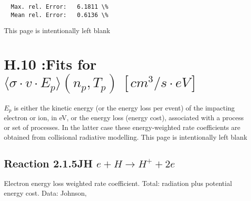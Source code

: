 \documentclass[12pt,dvipdfmx]{article}
\begin{document}
\begin{small}
\begin{verbatim}
  Max. rel. Error:   6.1811 \%
  Mean rel. Error:   0.6136 \%

\end{verbatim}\end{small}



\newpage
This page is intentionally left blank
\newpage
\section{H.10 :Fits for $\langle\sigma \cdot v \cdot E_p \rangle (n_p,T_p) \
[cm^3/s \cdot eV]$}

$E_p$ is either the kinetic energy (or the energy loss per event) of the impacting electron or ion, in eV, or the
energy loss (energy cost), associated with a process or set of processes.
In the latter case these energy-weighted rate coefficients are obtained from
collisional radiative modelling.
\newpage
This page is intentionally left blank
\newpage

\subsection{
Reaction 2.1.5JH  $ e + H \rightarrow H^+ + 2e $
}

Electron energy loss weighted rate coefficient.
Total: radiation plus potential energy cost. Data: Johnson, \cite{kn:Mahn}
\end{document}
